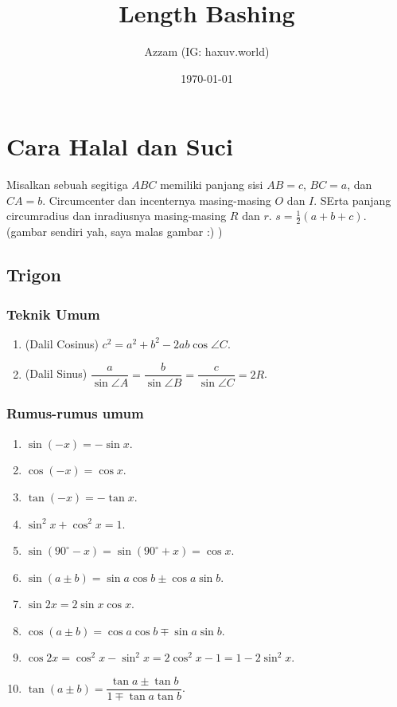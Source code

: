 \documentclass[12pt]{scrartcl}
\title{Length Bashing}
\author{Azzam (IG: haxuv.world)}
\date{\today}
\begin{document}
\maketitle

\renewcommand*\contentsname{Daftar Isi}
\tableofcontents

\newpage

\section{Cara Halal dan Suci}
Misalkan sebuah segitiga $ABC$ memiliki panjang sisi $AB=c$, $BC=a$, dan $CA=b$. Circumcenter dan incenternya masing-masing $O$ dan $I$. SErta panjang circumradius dan inradiusnya masing-masing $R$ dan $r$. $s=\frac{1}{2}(a+b+c)$. (gambar sendiri yah, saya malas gambar :) )

\subsection{Trigon}
\subsubsection{Teknik Umum}
\begin{enumerate}
    \item (Dalil Cosinus) $c^2=a^2+b^2-2ab \cos \angle C$.
    \item (Dalil Sinus) $\dfrac{a}{\sin \angle A}=\dfrac{b}{\sin \angle B}=\dfrac{c}{\sin \angle C}=2R$.
\end{enumerate}

\subsubsection{Rumus-rumus umum}
\begin{enumerate}
    \item $\sin (-x) = -\sin x$.
    \item $\cos (-x) = \cos x$.
    \item $\tan(-x) = -\tan x$.
    \item $\sin^2 x + \cos^2 x = 1$.
    \item $\sin(90^\circ-x)=\sin(90^\circ+x)=\cos x$.
    \item $\sin(a \pm b) = \sin a \cos b \pm \cos a \sin b$.
    \item $\sin 2x = 2\sin x \cos x$.
    \item $\cos(a \pm b) = \cos a \cos b \mp \sin a \sin b$.
    \item $\cos 2x = \cos^2 x - \sin^2 x = 2\cos^2 x -1 = 1-2\sin^2 x$.
    \item $\tan(a \pm b) = \dfrac{\tan a \pm \tan b}{1 \mp \tan a \tan b}$.
\end{enumerate}
\end{document}

